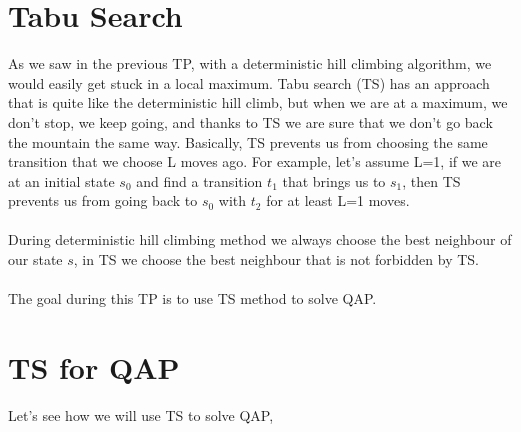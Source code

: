 \documentclass[a4paper]{article}
\begin{document}
\section{Tabu Search}
As we saw in the previous TP, with a deterministic hill climbing algorithm, we would easily get stuck in a local maximum. Tabu search (TS) has an approach that is quite like the deterministic hill climb, but when we are at a maximum, we don't stop, we keep going, and thanks to TS we are sure that we don't go back the mountain the same way. Basically, TS prevents us from choosing the same transition that we choose L moves ago. For example, let's assume L=1, if we are at an initial state $s_{0}$ and find a transition $t_1$ that brings us to $s_{1}$, then TS prevents us from going back to $s_0$ with $t_2$ for at least L=1 moves.\\\\
During deterministic hill climbing method we always choose the best neighbour of our state $s$, in TS we choose the best neighbour that is not forbidden by TS.\\\\
The goal during this TP is to use TS method to solve QAP.

\section{TS for QAP}
Let's see how we will use TS to solve QAP, 
\end{document}
